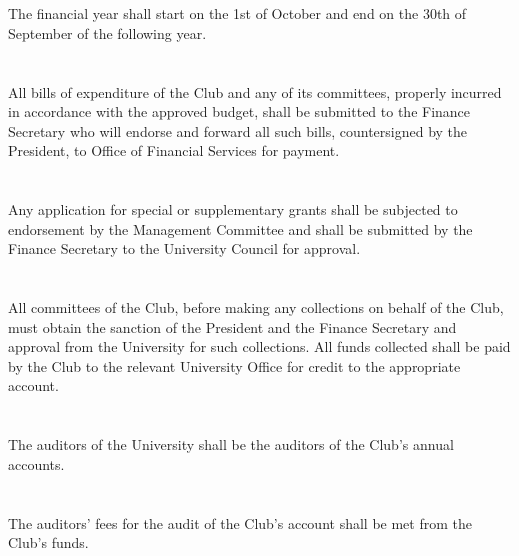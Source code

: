 
\section{}
The financial year shall start on the 1st of October and end on the 30th of September of the following year.

\section{}
All bills of expenditure of the Club and any of its committees, properly incurred in accordance with the approved budget, shall be submitted to the Finance Secretary who will endorse and forward all such bills, countersigned by the President, to Office of Financial Services for payment.

\section{}
Any application for special or supplementary grants shall be subjected to endorsement by the Management Committee and shall be submitted by the Finance Secretary to the University Council for approval.

\section{}
All committees of the Club, before making any collections on behalf of the Club, must obtain the sanction of the President and the Finance Secretary and approval from the University for such collections. All funds collected shall be paid by the Club to the relevant University Office for credit to the appropriate account.

\section{}
The auditors of the University shall be the auditors of the Club's annual accounts.

\section{}
The auditors' fees for the audit of the Club's account shall be met from the Club's funds.
